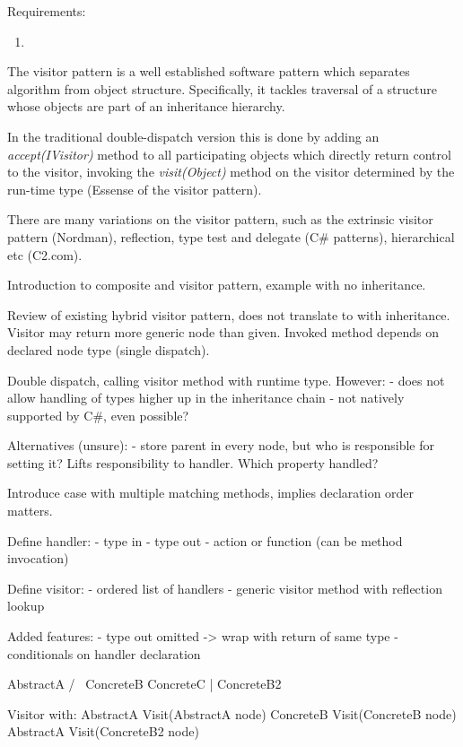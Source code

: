 \documentclass[final,a4paper,12pt]{article}
\begin{document}
Requirements:
\begin{enumerate}
	\item 
\end{enumerate}

The visitor pattern is a well established software pattern which separates algorithm from object structure. Specifically, it tackles traversal of a structure whose objects are part of an inheritance hierarchy.

In the traditional double-dispatch version this is done by adding an \textit{accept(IVisitor)} method to all participating objects which directly return control to the visitor, invoking the \textit{visit(Object)} method on the visitor determined by the run-time type (Essense of the visitor pattern).

There are many variations on the visitor pattern, such as the extrinsic visitor pattern (Nordman), reflection, type test and delegate (C\# patterns), hierarchical etc (C2.com).



Introduction to composite and visitor pattern, example with no inheritance.

Review of existing hybrid visitor pattern, does not translate to with inheritance. Visitor may return more generic node than given. Invoked method depends on declared node type (single dispatch).

Double dispatch, calling visitor method with runtime type. However:
- does not allow handling of types higher up in the inheritance chain
- not natively supported by C\#, even possible?

Alternatives (unsure):
- store parent in every node, but who is responsible for setting it? Lifts responsibility to handler. Which property handled?

Introduce case with multiple matching methods, implies declaration order matters.

Define handler:
- type in
- type out
- action or function (can be method invocation)

Define visitor:
- ordered list of handlers
- generic visitor method with reflection lookup

Added features:
- type out omitted -> wrap with return of same type
- conditionals on handler declaration

		AbstractA
		/      \
	ConcreteB	ConcreteC
		|
	ConcreteB2
		
Visitor with:
AbstractA Visit(AbstractA node)
ConcreteB Visit(ConcreteB node)
AbstractA Visit(ConcreteB2 node)
\end{document}
